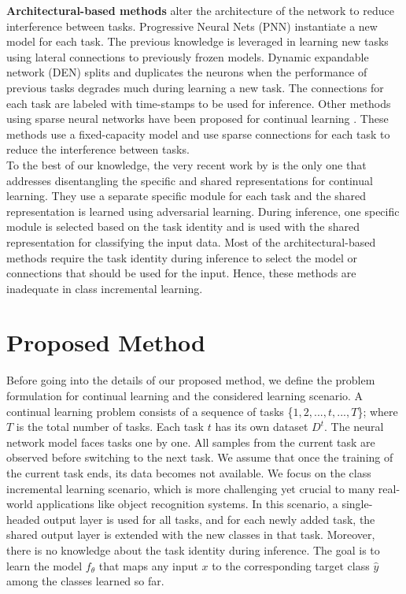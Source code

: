 \documentclass[letterpaper]{article} %
\begin{document}
\textbf{Architectural-based methods} alter the architecture of the network to reduce interference between tasks. Progressive Neural
Nets (PNN) instantiate a new model for each task. The previous knowledge is leveraged in learning new tasks using lateral connections to previously frozen models. Dynamic expandable network (DEN) \cite{yoon2018lifelong} splits and duplicates the neurons when the performance of previous tasks degrades much during learning a new task. The connections for each task are labeled with time-stamps to be used for inference. Other methods using sparse neural networks have been proposed for continual learning \cite{mallya2018piggyback,mallya2018packnet,sokar2020spacenet}. These methods use a fixed-capacity model and use sparse connections for each task to reduce the interference between tasks. \\
To the best of our knowledge, the very recent work by \cite{ebrahimi2020adversarial} is the only one that addresses disentangling the specific and shared representations for continual learning. They use a separate specific module for each task and the shared representation is learned using adversarial learning. During inference, one specific module is selected based on the task identity and is used with the shared representation for classifying the input data.
Most of the architectural-based methods require the task identity during inference to select the model or connections that should be used for the input. Hence, these methods are inadequate in class incremental learning. 


\section{Proposed Method}
Before going into the details of our proposed method, we define the problem formulation for continual learning and the considered learning scenario. A continual learning problem consists of a sequence of tasks \{$1, 2,..., t,..., T$\}; where $T$ is the total number of tasks. Each task $t$ has its own dataset $D^{t}$. The neural network model faces tasks one by one. All samples from the current task are observed before switching to the next task. We assume that once the training of the current task ends, its data becomes not available. We focus on the class incremental learning scenario, which is more challenging yet crucial to many real-world applications like object recognition systems. In this scenario, a single-headed output layer is used for all tasks, and for each newly added task, the shared output layer is extended with the new classes in that task. Moreover, there is no knowledge about the task identity during inference. The goal is to learn the model $f_{\theta}$ that maps any input $x$ to the corresponding target class $\hat{y}$ among the classes learned so far. 
\end{document}
